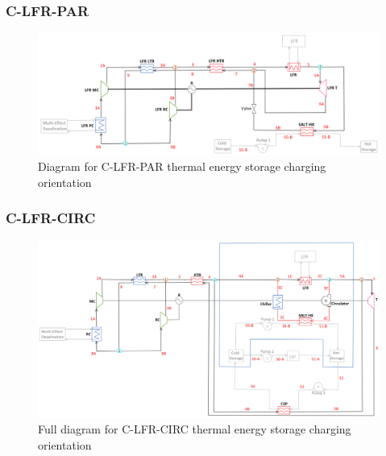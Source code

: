 \begin{paracol}{2}
\linenumbers
\switchcolumn


\subsubsection{C-LFR-PAR} %
\end{paracol}
\begin{figure}[H]
    \widefigure
    \includegraphics[width=\linewidth]{Definitions/c-lfr-par.pdf}
    \caption{Diagram for C-LFR-PAR thermal energy storage charging orientation\label{c-lfr-par}}
\end{figure}
\begin{paracol}{2}
\linenumbers
\switchcolumn

\subsubsection{C-LFR-CIRC} %
\end{paracol}
\begin{figure}[H]
    \widefigure
    \includegraphics[width=\linewidth]{Definitions/c-lfr-circ.pdf}
    \caption{Full diagram for C-LFR-CIRC thermal energy storage charging orientation\label{c-lfr-circ}}
\end{figure}
\begin{paracol}{2}
\linenumbers
\switchcolumn

\end{paracol}

